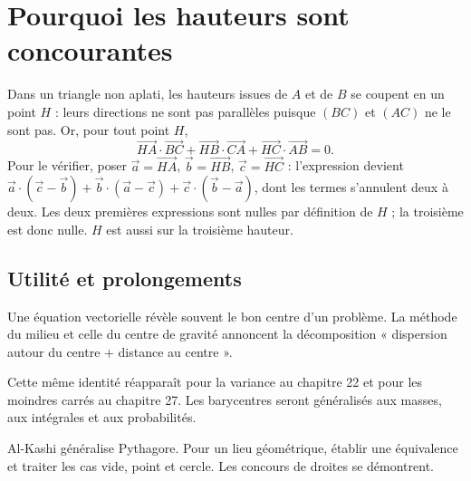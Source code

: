 \documentclass[../cours_1re.tex]{subfiles}
\begin{document}
\section{Pourquoi les hauteurs sont concourantes}
\approfondissement
Dans un triangle non aplati, les hauteurs issues de $A$ et de $B$ se coupent
en un point $H$ : leurs directions ne sont pas parallèles puisque
$(BC)$ et $(AC)$ ne le sont pas. Or, pour tout point $H$,
\[
\overrightarrow{HA}\cdot\overrightarrow{BC}
+\overrightarrow{HB}\cdot\overrightarrow{CA}
+\overrightarrow{HC}\cdot\overrightarrow{AB}=0.
\]
Pour le vérifier, poser $\vec a=\overrightarrow{HA}$,
$\vec b=\overrightarrow{HB}$, $\vec c=\overrightarrow{HC}$ :
l'expression devient
$\vec a\cdot(\vec c-\vec b)+\vec b\cdot(\vec a-\vec c)
+\vec c\cdot(\vec b-\vec a)$, dont les termes s'annulent deux à deux.
Les deux premières expressions sont nulles par définition de $H$ ;
la troisième est donc nulle. $H$ est aussi sur la troisième hauteur.

\begin{finchapitre}
\section{Utilité et prolongements}
Une équation vectorielle révèle souvent le bon centre d'un problème.
La méthode du milieu et celle du centre de gravité annoncent la décomposition
« dispersion autour du centre + distance au centre ».

Cette même identité réapparaît pour la variance au chapitre 22 et pour
les moindres carrés au chapitre 27. Les barycentres seront généralisés
aux masses, aux intégrales et aux probabilités.
\begin{retenir}
Al-Kashi généralise Pythagore. Pour un lieu géométrique, établir
une équivalence et traiter les cas vide, point et cercle. Les concours de droites se démontrent.
\end{retenir}
\end{finchapitre}
\end{document}
